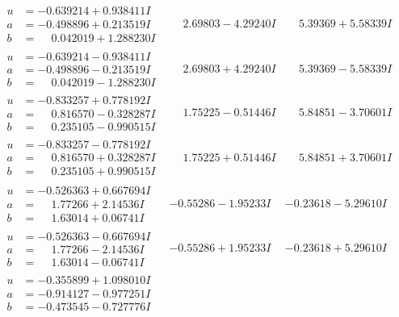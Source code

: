 \documentclass[1p]{elsarticle_modified}
\theoremstyle{definition}
\begin{document}
$$\begin{array}{c|c|c}
\begin{aligned}
u &= -0.639214 + 0.938411 I \\
a &= -0.498896 + 0.213519 I \\
b &= \phantom{-}0.042019 + 1.288230 I\end{aligned}
 & \phantom{-}2.69803 - 4.29240 I & \phantom{-}5.39369 + 5.58339 I \\ \hline\begin{aligned}
u &= -0.639214 - 0.938411 I \\
a &= -0.498896 - 0.213519 I \\
b &= \phantom{-}0.042019 - 1.288230 I\end{aligned}
 & \phantom{-}2.69803 + 4.29240 I & \phantom{-}5.39369 - 5.58339 I \\ \hline\begin{aligned}
u &= -0.833257 + 0.778192 I \\
a &= \phantom{-}0.816570 - 0.328287 I \\
b &= \phantom{-}0.235105 - 0.990515 I\end{aligned}
 & \phantom{-}1.75225 - 0.51446 I & \phantom{-}5.84851 - 3.70601 I \\ \hline\begin{aligned}
u &= -0.833257 - 0.778192 I \\
a &= \phantom{-}0.816570 + 0.328287 I \\
b &= \phantom{-}0.235105 + 0.990515 I\end{aligned}
 & \phantom{-}1.75225 + 0.51446 I & \phantom{-}5.84851 + 3.70601 I \\ \hline\begin{aligned}
u &= -0.526363 + 0.667694 I \\
a &= \phantom{-}1.77266 + 2.14536 I \\
b &= \phantom{-}1.63014 + 0.06741 I\end{aligned}
 & -0.55286 - 1.95233 I & -0.23618 - 5.29610 I \\ \hline\begin{aligned}
u &= -0.526363 - 0.667694 I \\
a &= \phantom{-}1.77266 - 2.14536 I \\
b &= \phantom{-}1.63014 - 0.06741 I\end{aligned}
 & -0.55286 + 1.95233 I & -0.23618 + 5.29610 I \\ \hline\begin{aligned}
u &= -0.355899 + 1.098010 I \\
a &= -0.914127 - 0.977251 I \\
b &= -0.473545 - 0.727776 I\end{aligned}

\end{array}$$
\end{document}
